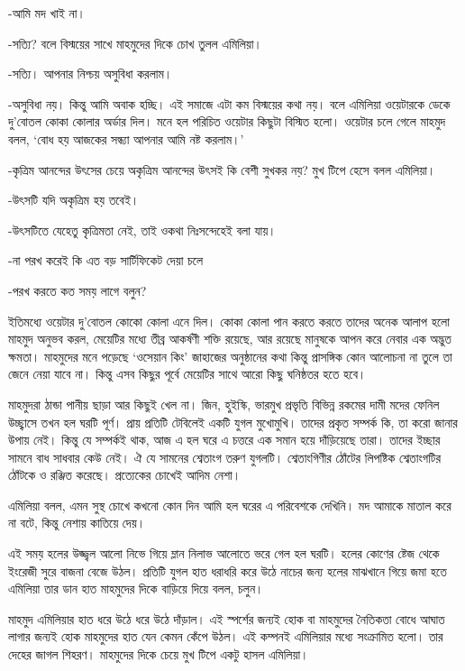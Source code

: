 \documentclass[
]{book}
\begin{document}
-আমি মদ খাই না।

-সত্যি? বলে বিস্ময়ের সাখে মাহমুদের দিকে চোখ তুলল এমিলিয়া।

-সত্যি। আপনার নিশ্চয় অসুবিধা করলাম।

-অসুবিধা নয়। কিন্তু আমি অবাক হচ্ছি। এই সমাজে এটা কম বিস্ময়ের কথা নয়। বলে এমিলিয়া ওয়েটারকে ডেকে দু'বোতল কোকা কোলার অর্ডার দিল। মনে হল পরিচিত ওয়েটার কিছুটা বিস্মিত হলো। ওয়েটার চলে গেলে মাহমুদ বলল, `বোধ হয় আজকের সন্ধ্যা আপনার আমি নষ্ট করলাম।'

-কৃত্রিম আনন্দের উৎসের চেয়ে অকৃত্রিম আনন্দের উৎসই কি বেশী সুখকর নয়? মুখ টিপে হেসে বলল এমিলিয়া।

-উৎসটি যদি অকৃত্রিম হয় তবেই।

-উৎসটিতে যেহেতু কৃত্রিমতা নেই, তাই ওকথা নিঃসন্দেহেই বলা যায়।

-না পরখ করেই কি এত বড় সার্টিফিকেট দেয়া চলে

-পরখ করতে কত সময় লাগে বলুন?

ইতিমধ্যে ওয়েটার দু'বোতল কোকো কোলা এনে দিল। কোকা কোলা পান করতে করতে তাদের অনেক আলাপ হলো মাহমুদ অনুভব করল, মেয়েটির মধ্যে তীব্র আকর্ষণী শক্তি রয়েছে, আর রয়েছে মানুষকে আপন করে নেবার এক অদ্ভুত ক্ষমতা। মাহমুদের মনে পড়েছে `ওসেয়ান কিং' জাহাজের অনুষ্ঠানের কথা কিন্তু প্রাসঙ্গিক কোন আলোচনা না তুলে তা জেনে নেয়া যাবে না। কিন্তু এসব কিছুর পূর্বে মেয়েটির সাথে আরো কিছু ঘনিষ্ঠতর হতে হবে।

মাহমুদরা ঠান্ডা পানীয় ছাড়া আর কিছুই খেল না। জিন, হুইস্কি, ভারমুখ প্রভৃতি বিভিন্ন রকমের দামী মদের ফেনিল উচ্ছ্বাসে তখন হল ঘরটি পূর্ণ। প্রায় প্রতিটি টেবিলেই একটি যুগল মুখোমুখি। তাদের প্রকৃত সম্পর্ক কি, তা করো জানার উপায় নেই। কিন্তু যে সম্পর্কই থাক, আজ এ হল ঘরে এ চত্তরে এক সমান হয়ে দাঁড়িয়েছে তারা। তাদের ইচ্ছার সামনে বাধ সাধবার কেউ নেই। ঐ যে সামনের শ্বেতাংগ তরুণ যুগলটি। শ্বেতাংগিণীর ঠোঁটের লিপষ্টিক শ্বেতাংগটির ঠোঁটকে ও রঞ্জিত করেছে। প্রত্যেকের চোখেই আদিম নেশা।

এমিলিয়া বলল, এমন সুস্থ চোখে কখনো কোন দিন আমি হল ঘরের এ পরিবেশকে দেখিনি। মদ আমাকে মাতাল করে না বটে, কিন্তু নেশায় কাতিয়ে দেয়।

এই সময় হলের উজ্জ্বল আলো নিভে গিয়ে ম্লান নিলাভ আলোতে ভরে গেল হল ঘরটি। হলের কোণের ষ্টেজ থেকে ইংরেজী সুরে বাজনা বেজে উঠল। প্রতিটি যুগল হাত ধরাধরি করে উঠে নাচের জন্য হলের মাঝখানে গিয়ে জমা হতে এমিলিয়া তার ডান হাত মাহমুদের দিকে বাড়িয়ে দিয়ে বলল, চলুন।

মাহমুদ এমিলিয়ার হাত ধরে উঠে ধরে উঠে দাঁড়াল। এই স্পর্শের জন্যই হোক বা মাহমুদের নৈতিকতা বোধে আঘাত লাগার জন্যই হোক মাহমুদের হাত যেন কেমন কেঁপে উঠল। এই কম্পনই এমিলিয়ার মধ্যে সংক্রামিত হলো। তার দেহের জাগল শিহরণ। মাহমুদের দিকে চেয়ে মুখ টিপে একটু হাসল এমিলিয়া।
\end{document}
